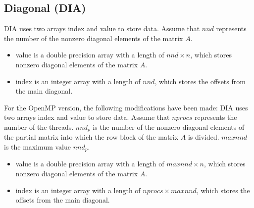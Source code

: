 \documentclass[a4paper]{article}
\begin{document}
\newpage
\subsection{Diagonal (DIA)}
DIA uses two arrays {\ttfamily index} and {\ttfamily value} to store
data. Assume that $nnd$ represents the number of the nonzero diagonal
elements of the matrix $A$.
\begin{itemize}
\item {\ttfamily value} is a double precision array with a length of
      $nnd \times n$, which stores nonzero diagonal elements of the matrix $A$.
\item {\ttfamily index} is an integer array with a length of $nnd$,
      which stores the offsets from the main diagonal.
\end{itemize}

For the OpenMP version, the following modifications have been made:
DIA uses two arrays {\ttfamily index} and {\ttfamily value} to store
data. Assume that $nprocs$ represents the number of the threads.
$nnd_p$ is the number of the nonzero diagonal elements of the partial matrix into which the row block of the matrix $A$ is divided.
$maxnnd$ is the maximum value $nnd_p$.
\begin{itemize}
\item {\ttfamily value} is a double precision array with a length of
      $maxnnd \times n$, which stores nonzero diagonal elements of the matrix $A$.
\item {\ttfamily index} is an integer array with a length of $nprocs
      \times maxnnd$, which stores the offsets from the main diagonal.
\end{itemize}
\end{document}
